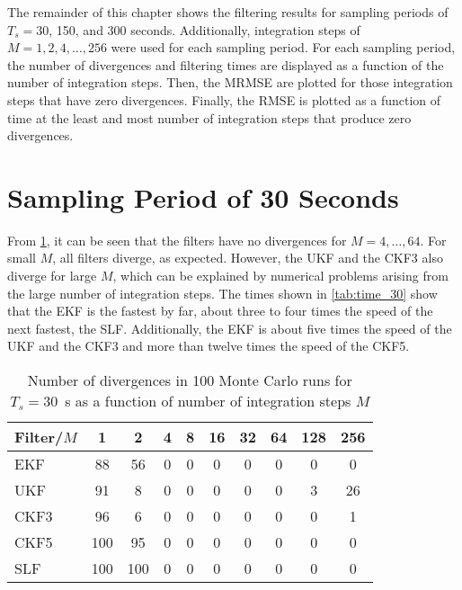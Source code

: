 \documentclass[../zhang_thesis.tex]{subfiles}
\begin{document}
The remainder of this chapter shows the filtering results for sampling periods of $T_s=30$, 150, and 300 seconds. Additionally, integration steps of $M=1,2,4,\dots,256$ were used for each sampling period. For each sampling period, the number of divergences and filtering times are displayed as a function of the number of integration steps. Then, the MRMSE are plotted for those integration steps that have zero divergences. Finally, the RMSE is plotted as a function of time at the least and most number of integration steps that produce zero divergences.

\clearpage

\section{Sampling Period of 30 Seconds}

From \cref{tab:div_30}, it can be seen that the filters have no divergences for $M=4,\dots,64$. For small $M$, all filters diverge, as expected. However, the UKF and the CKF3 also diverge for large $M$, which can be explained by numerical problems arising from the large number of integration steps. The times shown in \cref{tab:time_30} show that the EKF is the fastest by far, about three to four times the speed of the next fastest, the SLF. Additionally, the EKF is about five times the speed of the UKF and the CKF3 and more than twelve times the speed of the CKF5. 

\begin{table}[h]
\centering
\caption{Number of divergences in 100 Monte Carlo runs for $T_s=30$~s as a function of number of integration steps $M$}
\begin{tabular}{@{}l*{9}{c}@{}}
\toprule
Filter/$M$ & 1   & 2   & 4 & 8 & 16 & 32 & 64 & 128 & 256 \\
\midrule
EKF        & 88  & 56  & 0 & 0 & 0  & 0 & 0 & 0 & 0   \\
UKF        & 91  & 8   & 0 & 0 & 0  & 0 & 0 & 3 & 26  \\
CKF3       & 96  & 6   & 0 & 0 & 0  & 0 & 0 & 0 & 1   \\
CKF5       & 100 & 95  & 0 & 0 & 0  & 0 & 0 & 0 & 0   \\
SLF        & 100 & 100 & 0 & 0 & 0  & 0 & 0 & 0 & 0   \\
\bottomrule
\end{tabular}
\label{tab:div_30}
\end{table}
\end{document}
